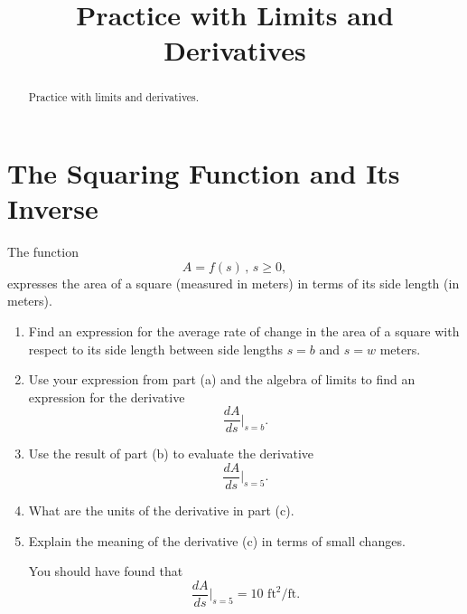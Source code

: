 \documentclass{ximera}
\title{Practice with Limits and Derivatives}
\begin{document}
\begin{abstract}
Practice with limits and derivatives.
\end{abstract}
\maketitle


\section{The Squaring Function and Its Inverse}

\begin{question}  \label{QPodfoitte43}
The function
\[
         A = f(s) \, , \, s\geq 0 ,
\]
expresses the area of a square (measured in meters) in terms of its side length (in meters).

\begin{enumerate}
\item Find an expression for the average rate of change in the area of a square with respect to its side length between side lengths $s=b$ and $s=w$ meters.

\item Use your expression from part (a) and the algebra of limits to find an expression for the derivative
\[
      \frac{dA}{ds}\Big|_{s=b}.
\]

\item Use the result of part (b) to evaluate the derivative
\[
   \frac{dA}{ds}\Big|_{s=5}.
\]

\item What are the units of the derivative in part (c).

\item Explain the meaning of the derivative (c) in terms of small changes.

\begin{explanation}
You should have found that
\[
    \frac{dA}{ds}\Big|_{s=5} = 10 \text{ ft}^2/\text{ft} .
\]

\end{explanation}

\end{enumerate}

\end{question}
\end{document}
